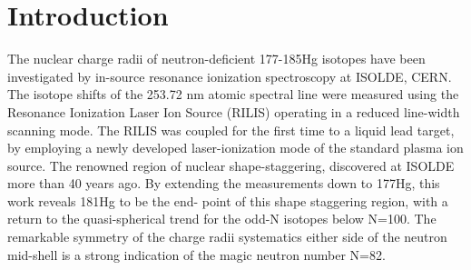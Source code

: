\section{Introduction}
The nuclear charge radii of neutron-deficient 177-185Hg isotopes have been investigated by in-source resonance ionization spectroscopy at ISOLDE, CERN.  The isotope shifts of the 253.72 nm atomic spectral line were measured using the Resonance Ionization Laser Ion Source (RILIS) operating in a reduced line-width scanning mode.  The RILIS was coupled for the first time to a liquid lead target, by employing a newly developed laser-ionization mode of the standard plasma ion source. The renowned region of nuclear shape-staggering, discovered at ISOLDE more than 40 years ago.  By extending the measurements down to 177Hg, this work reveals 181Hg to be the end- point of this shape staggering region, with a return to the quasi-spherical trend for the odd-N isotopes below N=100.  The remarkable symmetry of the charge radii systematics either side of the neutron mid-shell is a strong indication of the magic neutron number N=82.